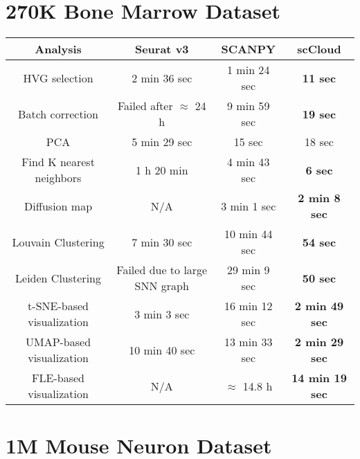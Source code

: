 \documentclass[10pt]{article}
\begin{document}
\section{270K Bone Marrow Dataset}

\begin{table}[H]
	\centering
	\begin{tabular}{|c|c|c|c|}
		\hline
		Analysis & Seurat v3 & SCANPY & scCloud\\
		\hline \hline
		HVG selection & 2 min 36 sec & 1 min 24 sec & \textbf{11 sec} \\
		\hline
		Batch correction & Failed after $\approx$ 24 h & 9 min 59 sec & \textbf{19 sec} \\
		\hline
		PCA & 5 min 29 sec & 15 sec & 18 sec \\
		\hline
		Find K nearest neighbors &  1 h 20 min &  4 min 43 sec & \textbf{6 sec}\\
		\hline
		Diffusion map & N/A & 3 min 1 sec & \textbf{2 min 8 sec} \\
		\hline
		Louvain Clustering & 7 min 30 sec & 10 min 44 sec & \textbf{54 sec} \\
		\hline 
		Leiden Clustering & Failed due to large SNN graph & 29 min 9 sec & \textbf{50 sec}\\
		\hline
		t-SNE-based visualization & 3 min 3 sec & 16 min 12 sec & \textbf{2 min 49 sec}\\
		\hline
		UMAP-based visualization & 10 min 40 sec & 13 min 33 sec  & \textbf{2 min 29 sec}\\
		\hline
		FLE-based visualization & N/A & $\approx$ 14.8  h & \textbf{14 min 19 sec}\\
		\hline
	\end{tabular}
\end{table}

\section{1M Mouse Neuron Dataset}
\end{document}
